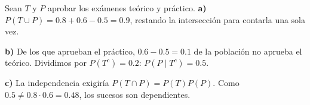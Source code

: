 Sean $T$ y $P$ aprobar los exámenes teórico y práctico.
\textbf{a)} $P(T\cup P)=0.8+0.6-0.5=\boxed{0.9}$, restando la
intersección para contarla una sola vez.

\textbf{b)} De los que aprueban el práctico, $0.6-0.5=0.1$ de
la población no aprueba el teórico. Dividimos por $P(T^c)=0.2$:
$P(P\mid T^c)=\boxed{0.5}$.

\textbf{c)} La independencia exigiría $P(T\cap P)=P(T)P(P)$.
Como $0.5\ne0.8\cdot0.6=0.48$, los sucesos son dependientes.
